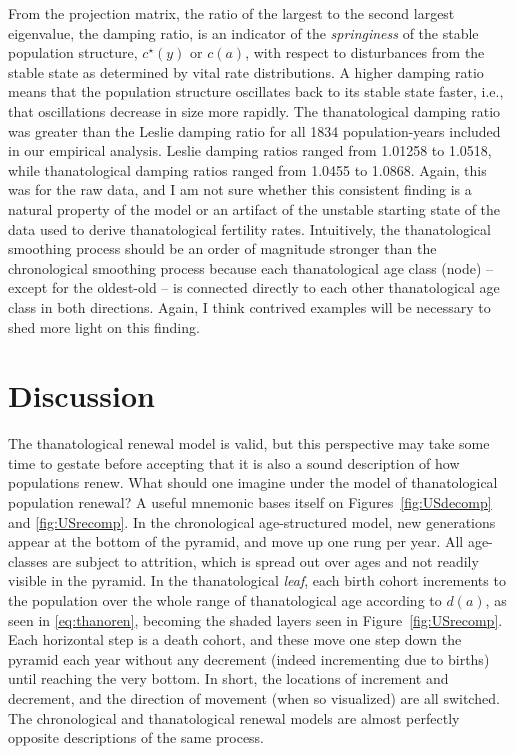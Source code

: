 \documentclass{article}
\begin{document}
From the projection matrix, the ratio of the largest to the second largest
eigenvalue, the damping ratio, is an indicator of the \textit{springiness} of
the stable population structure, $c^\star(y)$ or $c(a)$, with respect to
disturbances from the stable state as determined by vital rate distributions. A
higher damping ratio means that the population structure oscillates back to
its stable state faster, i.e., that oscillations decrease in size more rapidly. The thanatological damping ratio was
greater than the Leslie damping ratio for all 1834 population-years included in
our empirical analysis. Leslie damping ratios ranged from 1.01258 to 1.0518,
while thanatological damping ratios ranged from 1.0455 to 1.0868. Again, this
was for the raw data, and I am not sure whether this consistent finding is a
natural property of the model or an artifact of the unstable starting state of
the data used to derive thanatological fertility rates. Intuitively, the
thanatological smoothing process should be an order of magnitude stronger than
the chronological smoothing process because each thanatological age class
(node) -- except for the oldest-old -- is connected directly to each other
thanatological age class in both directions. Again, I think contrived examples
will be necessary to shed more light on this finding.

\section{Discussion}
The thanatological renewal model is valid, but this perspective may take some
time to gestate before accepting that it is also a sound description of how
populations renew. What should one imagine under the model of thanatological
population renewal? A useful mnemonic bases itself on Figures~\ref{fig:USdecomp}
and \ref{fig:USrecomp}. In the chronological age-structured model, new
generations appear at the bottom of the pyramid, and move up one rung per year.
All age-classes are subject to attrition, which is spread out over ages and not
readily visible in the pyramid. In the thanatological \textit{leaf}, each birth cohort increments to the population over the whole range of thanatological age
according to $d(a)$, as seen in \eqref{eq:thanoren}, becoming the
shaded layers seen in Figure~\ref{fig:USrecomp}. Each horizontal step is a death
cohort, and these move one step down the pyramid each year without any decrement
(indeed incrementing due to births) until reaching the very bottom. In short,
the locations of increment and decrement, and the direction of movement (when
so visualized) are all switched. The chronological and thanatological renewal
models are almost perfectly opposite descriptions of the same process. 
\end{document}
